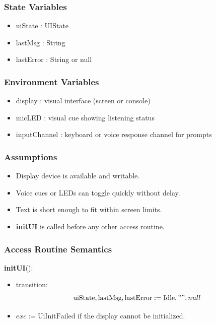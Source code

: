 \documentclass[12pt, titlepage]{article}
\begin{document}
\subsubsection{State Variables}

\begin{itemize}
  \item uiState : UIState
  \item lastMsg : String
  \item lastError : String or null
\end{itemize}

\subsubsection{Environment Variables}

\begin{itemize}
  \item display : visual interface (screen or console)
  \item micLED : visual cue showing listening status
  \item inputChannel : keyboard or voice response channel for prompts
\end{itemize}

\subsubsection{Assumptions}

\begin{itemize}
  \item Display device is available and writable.
  \item Voice cues or LEDs can toggle quickly without delay.
  \item Text is short enough to fit within screen limits.
  \item \textbf{initUI} is called before any other access routine.
\end{itemize}

\subsubsection{Access Routine Semantics}

\noindent
\textbf{initUI}():
\begin{itemize}
  \item transition:
  \[
    \text{uiState}, \text{lastMsg}, \text{lastError}
    := \text{Idle}, "", null
  \]
  \item $exc := \text{UiInitFailed}$ if the display cannot be initialized.
\end{itemize}
\end{document}
